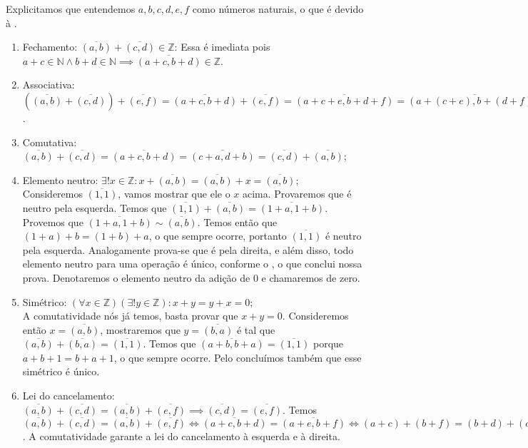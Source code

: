 \documentclass[../main.tex]{subfiles}
\begin{document}
\begin{dem}
    Explicitamos que entendemos $a,b,c,d,e,f$ como números naturais, o que é devido à .
    \begin{enumerate}[label=(\roman*)]
        \item Fechamento: $\overline{(a,b)} + \overline{(c,d)} \in \mathbb{Z}$:
        Essa é imediata pois $a+c \in \mathbb{N} \land b+d \in \mathbb{N} \implies \overline{(a+c,b+d)} \in \mathbb{Z}$.

        \item Associativa: 
        $\left(\overline{(a,b)} + \overline{(c,d)}\right) +  \overline{(e,f)} =
        \overline{(a+c,b+d)}+\overline{(e,f)} = \overline{(a+c+e, b+d+f)} = \overline{ \left( a+(c+e), b+(d+f) \right) } = \overline{(a,b)} + 
        \overline{ (c+e, d+f) } = \overline{(a,b)} + \left( \overline{(c,d)} + \overline{(e,f)} \right)$.
       
        \item Comutativa: $\overline{(a,b)} + \overline{(c,d)} = \overline{(a+c,b+d)} = \overline{(c+a,d+b)} = \overline{(c,d)} + \overline{(a,b)}$;
       
        \item Elemento neutro: $\exists! x \in \mathbb{Z} : x + \overline{(a,b)} = \overline{(a,b)} + x = \overline{(a,b)}$; \\
        Consideremos $\overline{(1,1)}$, vamos mostrar que ele o $x$ acima. 
        Provaremos que é neutro pela esquerda. Temos que $\overline{(1,1)} + \overline{(a,b)} = \overline{(1+a,1+b)}$. Provemos que $\overline{(1+a,1+b)} \sim \overline{(a,b)}$.
        Temos então que $(1+a)+b = (1+b)+a$, o que sempre ocorre, portanto $\overline{(1,1)}$ é neutro pela esquerda. Analogamente prova-se que é pela direita, e além disso, todo elemento neutro para uma operação é único, conforme o , o que conclui nossa prova. Denotaremos o elemento neutro da adição de $0$ e chamaremos de zero.
       
        \item Simétrico: $(\forall x \in \mathbb{Z}) (\exists!y \in \mathbb{Z}) : x + y = y + x  = 0$; \\
        A comutatividade nós já temos, basta provar que $x + y = 0$.
        Consideremos então $x = \overline{(a,b)}$, mostraremos que $y = \overline{(b,a)}$ é tal que $\overline{(a,b)} + \overline{(b,a)} = \overline{(1,1)}$. Temos que $\overline{(a+b,b+a)} = \overline{(1,1)}$ porque $a+b+1 = b+a+1$, o que sempre ocorre. Pelo  concluímos também que esse simétrico é único.
       
        \item Lei do cancelamento: $\overline{(a,b)} + \overline{(c,d)} = \overline{(a,b)} + \overline{(e,f)} \implies \overline{(c,d)} = \overline{(e,f)}$.
        Temos $\overline{(a,b)} + \overline{(c,d)} = \overline{(a,b)} + \overline{(e,f)} \iff \overline{(a+c,b+d)} = \overline{(a+e,b+f)} \iff (a+c)+(b+f)=(b+d)+(a+e) \iff c+f = d+e \iff \overline{(c,d)} = \overline{(e,f)}$. A comutatividade garante a lei do cancelamento à esquerda e à direita.


    \end{enumerate}
\end{dem}
\end{document}
